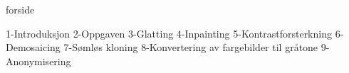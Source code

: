 \documentclass{article}
\begin{document}
{forside}

\tableofcontents
\listoffigures
\listoftables

\mainmatter
{1-Introduksjon}
{2-Oppgaven}
{3-Glatting}
{4-Inpainting}
{5-Kontrastforsterkning}
{6-Demosaicing}
{7-Sømløs kloning}
{8-Konvertering av fargebilder til gråtone}
{9-Anonymisering}

\newpage

\end{document}

